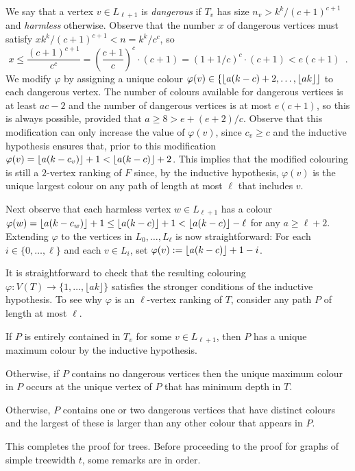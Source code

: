\documentclass[kpfonts]{patmorin}
\theoremstyle{named}
\begin{document}
We say that a vertex $v\in L_{\ell+1}$ is \emph{dangerous} if $T_v$ has size $n_v> k^k/(c+1)^{c+1}$ and \emph{harmless} otherwise.  Observe that the number $x$ of dangerous vertices must satisfy $xk^k/(c+1)^{c+1} < n = k^k/c^c$, so
\[
  x \le \frac{(c+1)^{c+1}}{c^c} = \left(\frac{c+1}{c}\right)^c\cdot(c+1)
  = (1+1/c)^c\cdot (c+1) < e(c+1) \enspace .
\]
We modify $\varphi$ by assigning a unique colour $\varphi(v)\in\{{\lfloor a(k-c)+2,\ldots,{\lfloor ak \rfloor} \rfloor}$ to each dangerous vertex.  The number of colours available for dangerous vertices is at least $ac-2$ and the number of dangerous vertices is at most $e(c+1)$, so this is always possible, provided that
$a \ge 8 > e + (e+2)/c$.  Observe that this modification can only increase the value of $\varphi(v)$, since $c_v \ge c$ and the inductive hypothesis ensures that, prior to this modification $\varphi(v)={\lfloor a(k-c_v) \rfloor}+1 < {\lfloor a(k-c) \rfloor}+2$.  This implies that the modified colouring is still a $2$-vertex ranking of $F$ since, by the inductive hypothesis, $\varphi(v)$ is the unique largest colour on any path of length at most $\ell$ that includes $v$.

Next observe that each harmless vertex $w\in L_{\ell+1}$ has a colour $\varphi(w) = {\lfloor a(k-c_w) \rfloor}+1 \le {\lfloor a(k-c) \rfloor}+1 < {\lfloor a(k-c) \rfloor}-\ell$ for any $a\ge \ell+2$. Extending $\varphi$ to the vertices in $L_0,\ldots,L_{\ell}$ is now straightforward:  For each $i\in\{0,\ldots,\ell\}$ and each $v\in L_i$, set $\varphi(v):={\lfloor a(k-c) \rfloor}+1-i$.

It is straightforward to check that the resulting colouring $\varphi:V(T)\to\{1,\ldots,\lfloor ak\rfloor\}$ satisfies the stronger conditions of the inductive hypothesis.  To see why $\varphi$ is an $\ell$-vertex ranking of $T$, consider any path $P$ of length at most $\ell$.
\begin{compactitem}
  \item If $P$ is entirely contained in $T_v$ for some $v\in L_{\ell+1}$, then $P$ has a unique maximum colour by the inductive hypothesis.

  \item Otherwise, if $P$ contains no dangerous vertices then the unique maximum colour in $P$ occurs at the unique vertex of $P$ that has minimum depth in $T$.

  \item Otherwise, $P$ contains one or two dangerous vertices that have distinct colours and the largest of these is larger than any other colour that appears in $P$.
\end{compactitem}
This completes the proof for trees.  Before proceeding to the proof for graphs of simple treewidth $t$, some remarks are in order.
\end{document}
